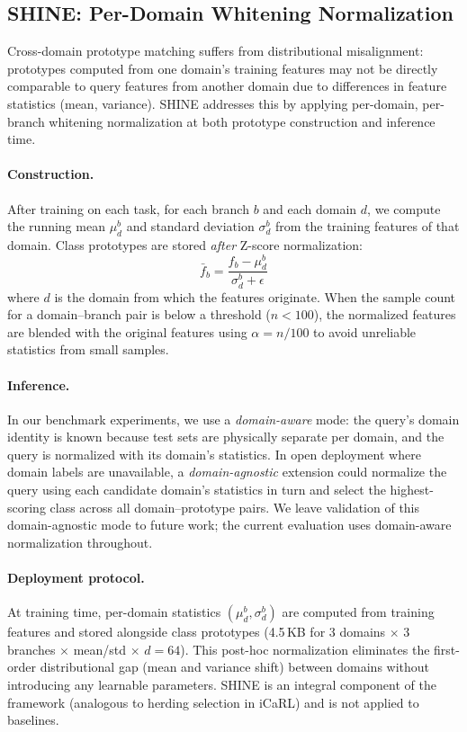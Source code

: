 \subsection{SHINE: Per-Domain Whitening Normalization}
\label{sec:shine}

Cross-domain prototype matching suffers from distributional misalignment: prototypes computed from one domain's training features may not be directly comparable to query features from another domain due to differences in feature statistics (mean, variance).
SHINE addresses this by applying per-domain, per-branch whitening normalization at both prototype construction and inference time.

\paragraph{Construction.}
After training on each task, for each branch $b$ and each domain $d$, we compute the running mean $\mu_d^b$ and standard deviation $\sigma_d^b$ from the training features of that domain.
Class prototypes are stored \emph{after} Z-score normalization:
\begin{equation}
    \bar{f}_b = \frac{f_b - \mu_d^b}{\sigma_d^b + \epsilon}
\label{eq:shine_norm}
\end{equation}
where $d$ is the domain from which the features originate.
When the sample count for a domain--branch pair is below a threshold ($n < 100$), the normalized features are blended with the original features using $\alpha = n/100$ to avoid unreliable statistics from small samples.

\paragraph{Inference.}
In our benchmark experiments, we use a \emph{domain-aware} mode: the query's domain identity is known because test sets are physically separate per domain, and the query is normalized with its domain's statistics.
In open deployment where domain labels are unavailable, a \emph{domain-agnostic} extension could normalize the query using each candidate domain's statistics in turn and select the highest-scoring class across all domain--prototype pairs.
We leave validation of this domain-agnostic mode to future work; the current evaluation uses domain-aware normalization throughout.

\paragraph{Deployment protocol.}
At training time, per-domain statistics $(\mu_d^b, \sigma_d^b)$ are computed from training features and stored alongside class prototypes (4.5\,KB for 3 domains $\times$ 3 branches $\times$ mean/std $\times$ $d{=}64$).
This post-hoc normalization eliminates the first-order distributional gap (mean and variance shift) between domains without introducing any learnable parameters.
SHINE is an integral component of the \methodname{} framework (analogous to herding selection in iCaRL) and is not applied to baselines.

